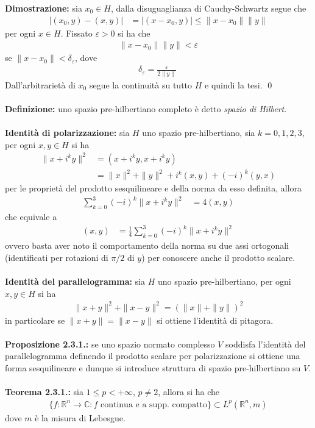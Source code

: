 \documentclass{article}
\numberwithin{equation}{subsection}
\begin{document}
\textbf{Dimostrazione:} sia $x_0 \in H$, dalla disuguaglianza di Cauchy-Schwartz segue che 
\begin{align*}
    |(x_0, y) - (x, y)| &= |(x - x_0, y)| \leq \|x - x_0\|\|y\| 
\end{align*}
per ogni $x \in H$. Fissato $\varepsilon > 0$ si ha che 
\begin{align*}
    \|x - x_0\|\|y\| < \varepsilon 
\end{align*}
se $\|x - x_0\| < \delta_\varepsilon$, dove 
\begin{align*}
    \delta_\varepsilon = \frac{\varepsilon}{2\|y\|}\ 
\end{align*}
Dall'arbitrarietà di $x_0$ segue la continuità su tutto $H$ e quindi la tesi. \qed \\ \\
\textbf{Definizione:} uno spazio pre-hilbertiano completo è detto \textit{spazio di Hilbert}. \\ \\
\textbf{Identità di polarizzazione:} sia $H$ uno spazio pre-hilbertiano, sia $k = 0, 1, 2, 3$, per ogni $x, y \in H$ si ha
\begin{align*}
    \|x + i^ky\|^2 &= (x + i^ky, x + i^ky)  \\
    &= \|x\|^2 + \|y\|^2 + i^k(x, y) + (-i)^k(y, x) 
\end{align*} 
per le proprietà del prodotto sesquilineare e della norma da esso definita, allora
\begin{align*}
    \sum_{k = 0}^3 (-i)^k\|x + i^ky\|^2 &= 4(x, y) 
\end{align*}
che equivale a 
\begin{align*}
    (x, y) &= \frac{1}{4}\sum_{k = 0}^3 (-i)^k\|x + i^ky\|^2 
\end{align*}
ovvero basta aver noto il comportamento della norma su due assi ortogonali (identificati per rotazioni di $\pi/2$ di $y$) per conoscere anche il prodotto scalare. \\ \\
\textbf{Identità del parallelogramma:} sia $H$ uno spazio pre-hilbertiano, per ogni $x, y \in H$ si ha 
\begin{align*}
    \|x + y\|^2 + \|x - y\|^2 = \left(\|x\| + \|y\|\right)^2 
\end{align*}
in particolare se $\|x + y\| = \|x - y\|$ si ottiene l'identità di pitagora. \\ \\
\textbf{Proposizione 2.3.1.:} se uno spazio normato complesso $V$ soddisfa l'identità del parallelogramma definendo il prodotto scalare per polarizzazione si ottiene una forma sesquilineare e dunque si introduce struttura di spazio pre-hilbertiano su $V$. \\ \\
\textbf{Teorema 2.3.1.:} sia $1 \leq p < +\infty$, $p \neq 2$, allora si ha che 
\begin{align*}
    \{f : \mathbb{R}^n \longrightarrow \mathbb{C} : f \text{ continua e a supp. compatto}\} \subset L^p(\mathbb{R}^n, m) 
\end{align*}
dove $m$ è la misura di Lebesgue. \\
\end{document}
